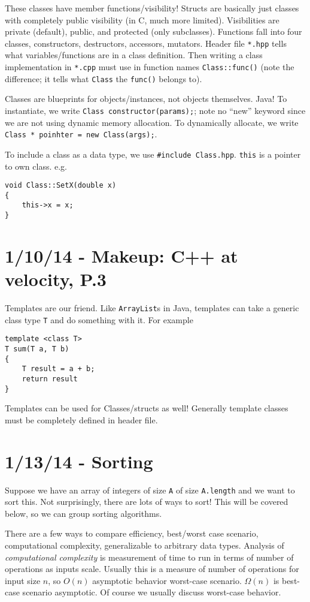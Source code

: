 \documentclass[10pt, twocolumn]{article}
\begin{document}
These classes have member functions/visibility! Structs are basically just classes with completely public visibility (in C, much more limited). Visibilities are private (default), public, and protected (only subclasses). Functions fall into four classes, constructors, destructors, accessors, mutators. Header file \texttt{*.hpp} tells what variables/functions are in a class definition. Then writing a class implementation in \texttt{*.cpp} must use in function names \texttt{Class::func()} (note the difference; it tells what \texttt{Class} the \texttt{func()} belongs to). 

Classes are blueprints for objects/instances, not objects themselves. Java! To instantiate, we write \texttt{Class constructor(params);}; note no ``new'' keyword since we are not using dynamic memory allocation. To dynamically allocate, we write \texttt{Class * poinhter = new Class(args);}.

To include a class as a data type, we use \texttt{\#include Class.hpp}. \texttt{this} is a pointer to own class. e.g.
\begin{verbatim}
void Class::SetX(double x)
{
    this->x = x;
}
\end{verbatim}

\section{1/10/14 - Makeup: C++ at velocity, P.3}

Templates are our friend. Like \texttt{ArrayList}s in Java, templates can take a generic class type \texttt{T} and do something with it. For example
\begin{verbatim}
template <class T>
T sum(T a, T b)
{
    T result = a + b;
    return result
}
\end{verbatim}

Templates can be used for Classes/structs as well! Generally template classes must be completely defined in header file.
\section{1/13/14 - Sorting}

Suppose we have an array of integers of size \texttt{A} of size \texttt{A.length} and we want to sort this. Not surprisingly, there are lots of ways to sort! This will be covered below, so we can group sorting algorithms.

There are a few ways to compare efficiency, best/worst case scenario, computational complexity, generalizable to arbitrary data types. Analysis of \emph{computational complexity} is measurement of time to run in terms of number of operations as inputs scale. Usually this is a measure of number of operations for input size $n$, so $O(n)$ asymptotic behavior worst-case scenario. $\Omega(n)$ is best-case scenario asymptotic. Of course we usually discuss worst-case behavior.
\end{document}
